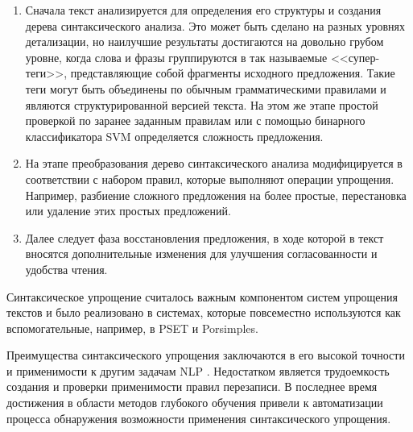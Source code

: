 \begin{enumerate}
	\item Сначала текст анализируется для определения его структуры и создания дерева синтаксического анализа. Это может быть сделано на разных уровнях детализации, но наилучшие результаты достигаются на довольно грубом уровне, когда слова и фразы группируются в так называемые <<супер-теги>>, представляющие собой фрагменты исходного предложения. Такие теги могут быть объединены по обычным грамматическими правилами и являются структурированной версией текста. На этом же этапе простой проверкой по заранее заданным правилам или с помощью бинарного классификатора SVM\footnotemark{} \cite{shardlow_survey_2014} определяется сложность предложения.
	
	\item На этапе преобразования дерево синтаксического анализа модифицируется в соответствии с набором правил, которые выполняют операции упрощения. Например, разбиение сложного предложения на более простые, перестановка или удаление этих простых предложений\cite{hutchison_ernesta_2013}.
	
	\item Далее следует фаза восстановления предложения, в ходе которой в текст вносятся дополнительные изменения для улучшения согласованности и удобства чтения.
\end{enumerate}

Синтаксическое упрощение считалось важным компонентом систем упрощения текстов и было реализовано в системах, которые повсеместно используются как вспомогательные, например, в PSET\cite{alva-manchego_data-driven_2020alva-manchego_data-driven_2020} и Porsimples\cite{aluisio_fostering_2010}.

Преимущества синтаксического упрощения заключаются в его высокой точности и применимости к другим задачам NLP \cite{shardlow_survey_2014}. Недостатком является трудоемкость создания и проверки применимости правил перезаписи. В последнее время достижения в области методов глубокого обучения привели к автоматизации процесса обнаружения возможности применения синтаксического упрощения.


